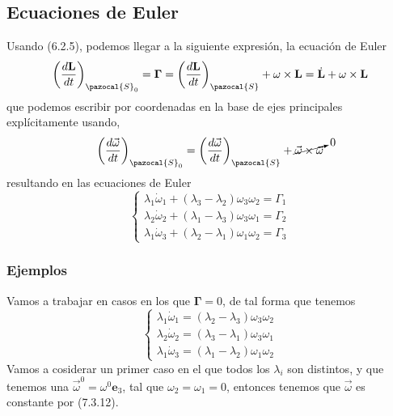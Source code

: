 \subsection{Ecuaciones de Euler}
Usando (6.2.5), podemos llegar a la siguiente expresión, la ecuación de Euler
\begin{equation} \label{6.1.1}
    \left(\frac{d\mathbf{L}}{dt}\right)_{\pazocal{S}_0} = \mathbf{\Gamma} = \left(\frac{d\mathbf{L}}{dt}\right)_{\pazocal{S}} + \omega \times \mathbf{L} = \dot{\mathbf{L}} + \omega \times \mathbf{L}
\end{equation}
que podemos escribir por coordenadas en la base de ejes principales explícitamente usando,
\begin{equation} \label{6.1.1}
    \left(\frac{d \vec{\omega}}{dt}\right)_{\pazocal{S}_0} = \left(\frac{d \vec{\omega}}{dt}\right)_\pazocal{S} + \cancelto{0}{\vec{\omega} \times \vec{\omega}}
\end{equation}
resultando en las ecuaciones de Euler
\begin{equation} \label{6.1.1}
    \left\{\begin{matrix}
        \lambda_1 \dot{\omega}_1 + (\lambda_3-\lambda_2) \omega_3 \omega_2 = \Gamma_1 \\
        \lambda_2 \dot{\omega}_2 + (\lambda_1-\lambda_3) \omega_3 \omega_1 = \Gamma_2\\
        \lambda_1 \dot{\omega}_3 + (\lambda_2-\lambda_1) \omega_1 \omega_2 = \Gamma_3
    \end{matrix}\right.
\end{equation}
\subsubsection{Ejemplos}
Vamos a trabajar en casos en los que $\mathbf{\Gamma} = 0$, de tal forma que tenemos
\begin{equation} \label{6.1.1}
    \left\{\begin{matrix}
        \lambda_1 \dot{\omega}_1 = (\lambda_2-\lambda_3) \omega_3 \omega_2  \\
        \lambda_2 \dot{\omega}_2 = (\lambda_3-\lambda_1) \omega_3 \omega_1 \\
        \lambda_1 \dot{\omega}_3 = (\lambda_1-\lambda_2) \omega_1 \omega_2 
    \end{matrix}\right.
\end{equation}
Vamos a cosiderar un primer caso en el que todos los $\lambda_i$ son distintos, y que tenemos una $\vec{\omega}^0 = \omega^0 \mathbf{e}_3$, tal que $\omega_2 = \omega_1 = 0$, entonces tenemos que $\vec{\omega}$ es constante por (7.3.12).

